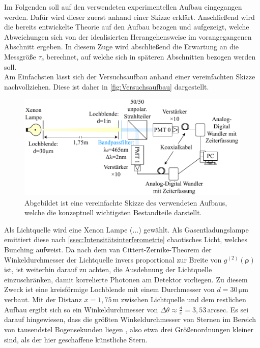 Im Folgenden soll auf den verwendeten experimentellen Aufbau eingegangen werden. 
Dafür wird dieser zuerst anhand einer Skizze erklärt. 
Anschließend wird die bereits entwickelte Theorie auf den Aufbau bezogen und aufgezeigt, welche Abweichungen sich von der idealisierten Herangehensweise im vorangegangenen Abschnitt ergeben. 
In diesem Zuge wird abschließend die Erwartung an die Messgröße $\tau_c$ berechnet, auf welche sich in späteren Abschnitten bezogen werden soll. \\

Am Einfachsten lässt sich der Versuchsaufbau anhand einer vereinfachten Skizze nachvollziehen. Diese ist daher in \autoref{fig:Versuchsaufbau} dargestellt. 
\begin{figure}[h]
    \centering
    \includegraphics[width=0.9\linewidth]{images/Aufbau/Aufbau.pdf}
    \caption{Abgebildet ist eine vereinfachte Skizze des verwendeten Aufbaus, welche die konzeptuell wichtigsten Bestandteile darstellt.}
    \label{fig:Versuchsaufbau}
\end{figure}
Als Lichtquelle wird eine Xenon Lampe (...) gewählt. 
Als Gasentladungslampe emittiert diese nach \autoref{ssec:Intensitätsinterferometrie} chaotisches Licht, welches Bunching aufweist. 
Da nach dem van Cittert-Zernike-Theorem der Winkeldurchmesser der Lichtquelle invers proportional zur Breite von $g^{(2)}(\bm{\rho})$ ist, ist weiterhin darauf zu achten, die Ausdehnung der Lichtquelle einzuschränken, damit korrelierte Photonen am Detektor vorliegen. 
Zu diesem Zweck ist eine kreisförmige Lochblende mit einem Durchmesser von $d=30\,\mathrm{\mu m}$ verbaut. 
Mit der Distanz $x=1{,}75\,\mathrm{m}$ zwischen Lichtquelle und dem restlichen Aufbau ergibt sich so ein Winkeldurchmesser von $\Delta \theta \approx \frac{d}{x} = 3{,}53\,\mathrm{arcsec}$. 
Es sei darauf hingewiesen, dass die größten Winkeldurchmesser von Sternen im Bereich von tausendstel Bogensekunden liegen \cite{hanburybrownAngularDiameters321974}, also etwa drei Größenordnungen kleiner sind, als der hier geschaffene \glqq künstliche Stern\grqq. \\

